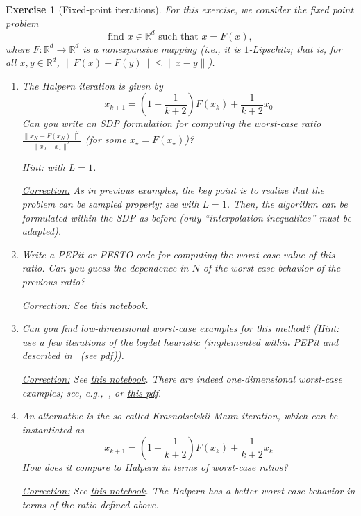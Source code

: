\documentclass[11pt,a4paper]{article}
\newcommand{\pesto}{{PESTO }}
\newcommand{\pepit}{{PEPit }}
\newcommand{\correction}[1]{{{\color{blue}\underline{Correction:} #1}}}
\newcommand{\correction}[1]{}
\newtheorem{exercise}{Exercise}
\begin{document}
	
	\begin{exercise}[Fixed-point iterations]\label{ex:halpern}
For this exercise, we consider the fixed point problem
	\[ \text{find } x\in\mathbb{R}^d \text{ such that } x=F(x), \]
	where $F:\mathbb{R}^d\rightarrow \mathbb{R}^d$ is a nonexpansive mapping (i.e., it is $1$-Lipschitz; that is, for all $x,y\in\mathbb{R}^d$, $\|F(x)-F(y)\|\leqslant \|x-y\|$).
	\begin{enumerate}
	\item The Halpern iteration is given by
	\[ x_{k+1} = \left(1-\frac{1}{k+2}\right)F(x_k) + \frac{1}{k+2} x_0\]
	Can you write an SDP formulation for computing the worst-case ratio $\frac{\|x_{N}-F(x_N)\|^2}{\|x_0-x_\star\|^2}$ (for some $x_\star=F(x_\star)$)?
	
	Hint:  with $L=1$.
	
	\correction{As in previous examples, the key point is to realize that the problem can be sampled properly; see \Cref{thm:Lipschitz_interpolation} with $L=1$. Then, the algorithm can be formulated within the SDP as before (only ``interpolation inequalites'' must be adapted).}
	
	\item Write a \pepit or \pesto code for computing the worst-case value of this ratio. Can you guess the dependence in $N$ of the worst-case behavior of the previous ratio?
	
	\correction{See \href{https://github.com/PerformanceEstimation/Learning-Performance-Estimation/tree/main/Codes/Jupyter/Exercise07.ipynb}{this notebook}.}
	
	\item Can you find low-dimensional worst-case examples for this method? (Hint: use a few iterations of the logdet heuristic (implemented within \pepit and described in~\cite{fazel2003log} (see \href{https://web.stanford.edu/~boyd/papers/pdf/rank_min_heur_hankel.pdf}{pdf})).
	
	\correction{See \href{https://github.com/PerformanceEstimation/Learning-Performance-Estimation/tree/main/Codes/Jupyter/Exercise07.ipynb}{this notebook}.  There are indeed one-dimensional worst-case examples; see, e.g.,~\cite[Example 3.1]{lieder2017convergence}, or \href{http://www.optimization-online.org/DB_FILE/2017/11/6336.pdf}{this pdf}.}
	
	\item An alternative is the so-called Krasnolselskii-Mann iteration, which can be instantiated as
	\[ x_{k+1} = \left(1-\frac{1}{k+2}\right)F(x_k) + \frac{1}{k+2} x_k\]
	How does it compare to Halpern in terms of worst-case ratios?
	
	\correction{See \href{https://github.com/PerformanceEstimation/Learning-Performance-Estimation/tree/main/Codes/Jupyter/Exercise07.ipynb}{this notebook}.  The Halpern has a better worst-case behavior in terms of the ratio defined above.}
	\end{enumerate}
	\end{exercise}
	
\end{document}

